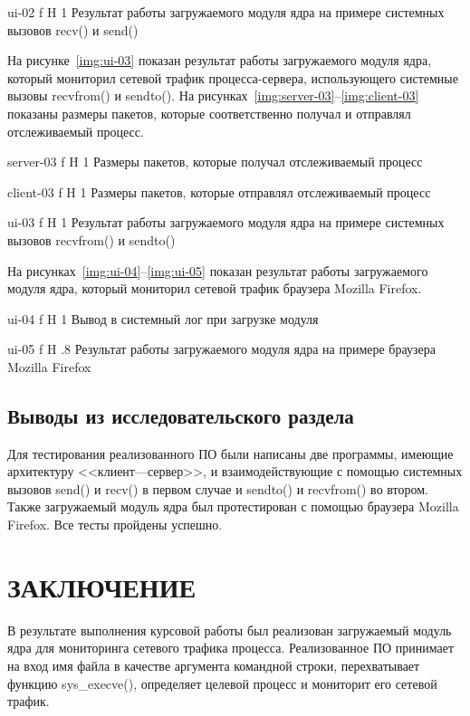 \documentclass{bmstu}
\begin{document}
    {ui-02}
    {f}
    {H}
    {1\textwidth}
    {Результат работы загружаемого модуля ядра на примере системных вызовов recv() и send()}
    
На рисунке~\ref{img:ui-03} показан результат работы загружаемого модуля ядра, который мониторил сетевой трафик процесса-сервера, использующего системные вызовы recvfrom() и sendto(). 
На рисунках~\ref{img:server-03}--\ref{img:client-03} показаны размеры пакетов, которые соответственно получал и отправлял отслеживаемый процесс.

    {server-03}
    {f}
    {H}
    {1\textwidth}
    {Размеры пакетов, которые получал отслеживаемый процесс}
    
    {client-03}
    {f}
    {H}
    {1\textwidth}
    {Размеры пакетов, которые отправлял отслеживаемый процесс}

    {ui-03}
    {f}
    {H}
    {1\textwidth}
    {Результат работы загружаемого модуля ядра на примере системных вызовов recvfrom() и sendto()}
    
На рисунках~\ref{img:ui-04}--\ref{img:ui-05} показан результат работы загружаемого модуля ядра, который мониторил сетевой трафик браузера Mozilla Firefox.

    {ui-04}
    {f}
    {H}
    {1\textwidth}
    {Вывод в системный лог при загрузке модуля}
    
    {ui-05}
    {f}
    {H}
    {.8\textwidth}
    {Результат работы загружаемого модуля ядра на примере браузера Mozilla Firefox}

\section*{Выводы из исследовательского раздела}

Для тестирования реализованного ПО были написаны две программы, имеющие архитектуру <<клиент---сервер>>, и взаимодействующие с помощью системных вызовов send() и recv() в первом случае и sendto() и recvfrom() во втором. 
Также загружаемый модуль ядра был протестирован с помощью браузера Mozilla Firefox. 
Все тесты пройдены успешно.

{\centering \chapter*{ЗАКЛЮЧЕНИЕ}}

В результате выполнения курсовой работы был реализован загружаемый модуль ядра для мониторинга сетевого трафика процесса. 
Реализованное ПО принимает на вход имя файла в качестве аргумента командной строки, перехватывает функцию sys\_execve(), определяет целевой процесс и мониторит его сетевой трафик.
\end{document}
